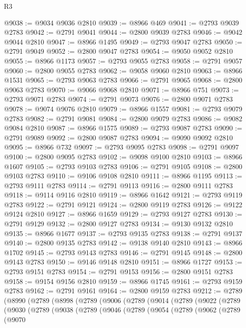 \begin{lexlean}{R3}
\begin{coremodule}
@9038 := @9034 @9036 @2810
@9039 := @8966 @469
@9041 := @2793 @9039 @2783
@9042 := @2791 @9041
@9044 := @2800 @9039 @2783
@9046 := @9042 @9044 @2810
@9047 := @8966 @1495
@9049 := @2793 @9047 @2783
@9050 := @2791 @9049
@9052 := @2800 @9047 @2783
@9054 := @9050 @9052 @2810
@9055 := @8966 @1173
@9057 := @2793 @9055 @2783
@9058 := @2791 @9057
@9060 := @2800 @9055 @2783
@9062 := @9058 @9060 @2810
@9063 := @8966 @1531
@9065 := @2793 @9063 @2783
@9066 := @2791 @9065
@9068 := @2800 @9063 @2783
@9070 := @9066 @9068 @2810
@9071 := @8966 @751
@9073 := @2793 @9071 @2783
@9074 := @2791 @9073
@9076 := @2800 @9071 @2783
@9078 := @9074 @9076 @2810
@9079 := @8966 @1557
@9081 := @2793 @9079 @2783
@9082 := @2791 @9081
@9084 := @2800 @9079 @2783
@9086 := @9082 @9084 @2810
@9087 := @8966 @1575
@9089 := @2793 @9087 @2783
@9090 := @2791 @9089
@9092 := @2800 @9087 @2783
@9094 := @9090 @9092 @2810
@9095 := @8966 @732
@9097 := @2793 @9095 @2783
@9098 := @2791 @9097
@9100 := @2800 @9095 @2783
@9102 := @9098 @9100 @2810
@9103 := @8966 @1607
@9105 := @2793 @9103 @2783
@9106 := @2791 @9105
@9108 := @2800 @9103 @2783
@9110 := @9106 @9108 @2810
@9111 := @8966 @1195
@9113 := @2793 @9111 @2783
@9114 := @2791 @9113
@9116 := @2800 @9111 @2783
@9118 := @9114 @9116 @2810
@9119 := @8966 @1642
@9121 := @2793 @9119 @2783
@9122 := @2791 @9121
@9124 := @2800 @9119 @2783
@9126 := @9122 @9124 @2810
@9127 := @8966 @1659
@9129 := @2793 @9127 @2783
@9130 := @2791 @9129
@9132 := @2800 @9127 @2783
@9134 := @9130 @9132 @2810
@9135 := @8966 @1677
@9137 := @2793 @9135 @2783
@9138 := @2791 @9137
@9140 := @2800 @9135 @2783
@9142 := @9138 @9140 @2810
@9143 := @8966 @1702
@9145 := @2793 @9143 @2783
@9146 := @2791 @9145
@9148 := @2800 @9143 @2783
@9150 := @9146 @9148 @2810
@9151 := @8966 @1727
@9153 := @2793 @9151 @2783
@9154 := @2791 @9153
@9156 := @2800 @9151 @2783
@9158 := @9154 @9156 @2810
@9159 := @8966 @1745
@9161 := @2793 @9159 @2783
@9162 := @2791 @9161
@9164 := @2800 @9159 @2783
@9212 := @2789
    (@8990
      (@2789
        (@8998
          (@2789
            (@9006
              (@2789
                (@9014
                  (@2789
                    (@9022
                      (@2789
                        (@9030
                          (@2789
                            (@9038
                              (@2789
                                (@9046
                                  (@2789
                                    (@9054
                                      (@2789
                                        (@9062
                                          (@2789
                                            (@9070

\end{coremodule}
\end{lexlean}
